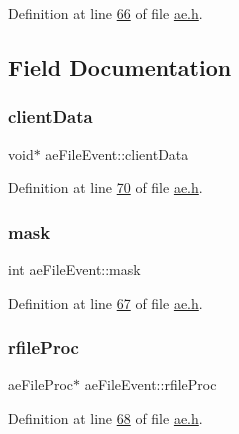 Definition at line \hyperlink{ae_8h_source_l00066}{66} of file \hyperlink{ae_8h_source}{ae.\+h}.



\subsection{Field Documentation}
\mbox{\label{structaeFileEvent_a001285b3f180bb6e776a97190fe47b7b}} 
\subsubsection{\texorpdfstring{client\+Data}{clientData}}
{\footnotesize\ttfamily void$\ast$ ae\+File\+Event\+::client\+Data}



Definition at line \hyperlink{ae_8h_source_l00070}{70} of file \hyperlink{ae_8h_source}{ae.\+h}.

\mbox{\label{structaeFileEvent_ac43aaab34810e8b6bfcc5a2576220959}} 
\subsubsection{\texorpdfstring{mask}{mask}}
{\footnotesize\ttfamily int ae\+File\+Event\+::mask}



Definition at line \hyperlink{ae_8h_source_l00067}{67} of file \hyperlink{ae_8h_source}{ae.\+h}.

\mbox{\label{structaeFileEvent_ae39bf42ed5c4cac998ee5c9fc4ee0069}} 
\subsubsection{\texorpdfstring{rfile\+Proc}{rfileProc}}
{\footnotesize\ttfamily ae\+File\+Proc$\ast$ ae\+File\+Event\+::rfile\+Proc}



Definition at line \hyperlink{ae_8h_source_l00068}{68} of file \hyperlink{ae_8h_source}{ae.\+h}.

